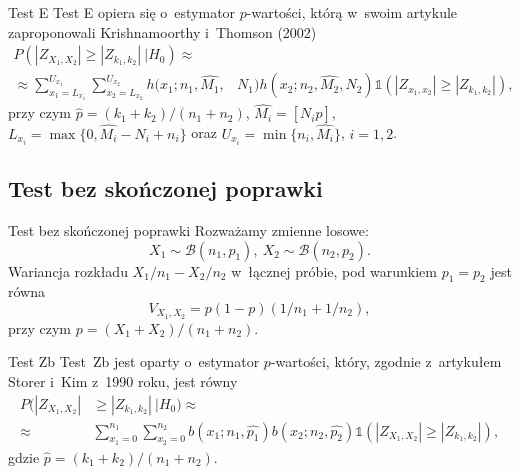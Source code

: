 \documentclass{beamer}
\newcommand{\1}[1]{\mathds{1}\left(#1\right)}
\begin{document}
\begin{frame}{Test E}
Test E opiera się o~estymator $p$-wartości, którą w~swoim artykule zaproponowali Krishnamoorthy i~Thomson (2002)~\cite{Krishnamoorthy2002}
\begin{equation}
\begin{split}
P(|Z_{X_1,X_2}|\geq|Z_{k_1,k_2}|\ |H_0) \approx& \\ \approx \sum_{x_1=L_{x_1}}^{U_{x_1}}\sum_{x_2=L_{x_2}}^{U_{x_2}} h(x_1;n_1,\hat{M_1},&N_1)h(x_2;n_2,\hat{M_2},N_2)\1{|Z_{x_1,x_2}|\geq|Z_{k_1,k_2}|},
\end{split}
\end{equation}
przy czym $\hat{p}=(k_1+k_2)/(n_1+n_2)$, $\hat{M_i}=[N_i\hat{p}]$, $L_{x_i}=\max\{0,\hat{M_i}-N_i+n_i\}$ oraz $U_{x_i}=\min\{n_i,\hat{M_i}\}$, $i=1,2$.
\end{frame}

\subsection{Test bez skończonej poprawki}
\begin{frame}{Test bez skończonej poprawki}
Rozważamy zmienne losowe:
\begin{equation}
X_1\sim \mathcal{B}(n_1,p_1),\ X_2\sim \mathcal{B}(n_2,p_2).
\end{equation}
Wariancja rozkładu $X_1/n_1-X_2/n_2$ w~łącznej próbie, pod warunkiem $p_1=p_2$ jest równa
\begin{equation}
V_{X_1,X_2} = p(1-p)(1/n_1+1/n_2),
\end{equation}
przy czym $p=(X_1+X_2)/(n_1+n_2)$.
\end{frame}

\begin{frame}{Test Zb}
Test~Zb jest oparty o~estymator $p$-wartości, który, zgodnie z~artykułem Storer i~Kim z~1990 roku, jest równy~\cite{Storer1990}
\begin{equation}
\begin{split}
P(|Z_{X_1,X_2}|&\geq|Z_{k_1,k_2}|\ |H_0) \approx \\
\approx & \sum_{x_1=0}^{n_1}\sum_{x_2=0}^{n_2} b(x_1;n_1,\hat{p_1})b(x_2;n_2,\hat{p_2})\1{|Z_{X_1,X_2}|\geq|Z_{k_1,k_2}|},
\end{split}
\end{equation}
gdzie $\hat{p}=(k_1+k_2)/(n_1+n_2)$.
\end{frame}
\end{document}
